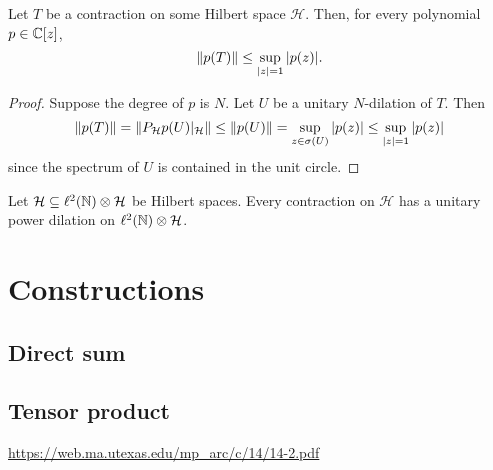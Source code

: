 \begin{proposition}
Let $T$ be a contraction on some Hilbert space $\mathcal{H}$. Then, for every polynomial $p\in\mathbb{C}[z]$,
\[ \lVert p(T)\rVert\leq \sup_{|z|=1}|p(z)|. \]
\end{proposition}
\begin{proof}
Suppose the degree of $p$ is $N$. Let $U$ be a unitary $N$-dilation of $T$. Then
\[ \lVert p(T)\rVert = \lVert P_\mathcal{H}p(U)|_\mathcal{H}\rVert\leq \lVert p(U)\rVert = \sup_{z\in\sigma(U)}|p(z)| \leq \sup_{|z|=1}|p(z)| \]
since the spectrum of $U$ is contained in the unit circle.
\end{proof}

\begin{theorem}
Let $\mathcal{H} \subseteq \ell^2(\mathbb{N})\otimes\mathcal{H}$ be Hilbert spaces. Every contraction on $\mathcal{H}$ has a unitary power dilation on $\ell^2(\mathbb{N})\otimes\mathcal{H}$.
\end{theorem}




\section{Constructions}
\subsection{Direct sum}
\subsection{Tensor product}
\url{https://web.ma.utexas.edu/mp_arc/c/14/14-2.pdf}

